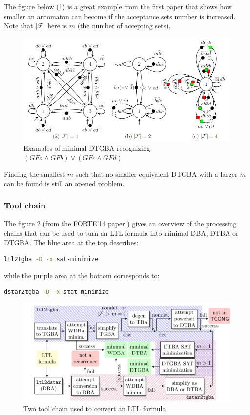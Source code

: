 \noindent The figure below (\ref{fig:accsets}) is a great example from the first paper \cite{14} that shows how
smaller an automaton can become if the acceptance sets number is increased. Note that $|\mathcal{F}|$ here
is $m$ (the number of accepting sets).
\begin{figure}[H]
 \centering
 \includegraphics[scale=0.5]{img/accsets_reduction.png}
 \caption{Examples of minimal DTGBA recognizing $(GFa \land GFb) \lor (GFc \land GFd)$}
 \label{fig:accsets}
\end{figure}

Finding the smallest $m$ such that no smaller equivalent DTGBA with a larger $m$ can be found is
still an opened problem.

\subsubsection{Tool chain}
The figure \ref{fig:tool_chain} (from the FORTE'14 paper \cite{14}) gives an overview of the processing
chains that can be used to turn an LTL formula \cite{13} into minimal DBA, DTBA or DTGBA.
The blue area at the top describes:
\begin{lstlisting}[language=bash,caption={bash command-line to translate a formula using ltl2tgba}]
  ltl2tgba -D -x sat-minimize
\end{lstlisting}

\noindent while the purple area at the bottom corresponds to:
\begin{lstlisting}[language=bash,caption={bash command-line to translate a formula using dstar2tgba}]
  dstar2tgba -D -x stat-minimize
\end{lstlisting}

\begin{figure}[H]
 \centering
 \includegraphics[scale=0.7]{img/tool_chain.png}
 \caption{Two tool chain used to convert an LTL formula}
 \label{fig:tool_chain}
\end{figure}

